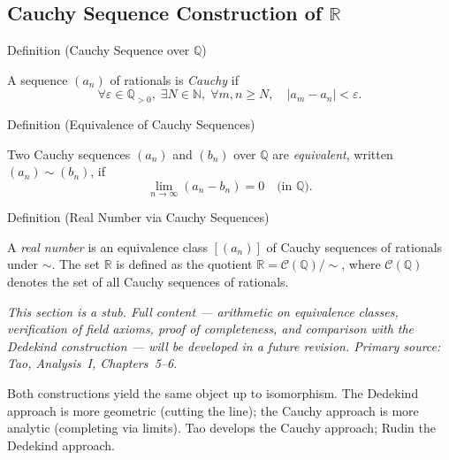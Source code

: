 
\subsection{\texorpdfstring{Cauchy Sequence Construction of $\mathbb{R}$}{Cauchy Sequence Construction of R}}

\begin{definitionbox}{Definition (Cauchy Sequence over $\mathbb{Q}$)}
\begin{definition}\label{def:cauchy-q}
A sequence $(a_n)$ of rationals is \emph{Cauchy} if
\[
  \forall \varepsilon \in \mathbb{Q}_{>0},\;
  \exists N \in \mathbb{N},\;
  \forall m, n \geq N,\quad |a_m - a_n| < \varepsilon.
\]
\end{definition}
\end{definitionbox}

\begin{definitionbox}{Definition (Equivalence of Cauchy Sequences)}
\begin{definition}\label{def:cauchy-equiv}
Two Cauchy sequences $(a_n)$ and $(b_n)$ over $\mathbb{Q}$ are
\emph{equivalent}, written $(a_n) \sim (b_n)$, if
\[
  \lim_{n\to\infty}(a_n - b_n) = 0 \quad \text{(in } \mathbb{Q}\text{)}.
\]
\end{definition}
\end{definitionbox}

\begin{definitionbox}{Definition (Real Number via Cauchy Sequences)}
\begin{definition}\label{def:real-as-cauchy}
A \emph{real number} is an equivalence class $[(a_n)]$ of Cauchy sequences
of rationals under $\sim$.
The set $\mathbb{R}$ is defined as the quotient
$\mathbb{R} = \mathcal{C}(\mathbb{Q}) / {\sim}$,
where $\mathcal{C}(\mathbb{Q})$ denotes the set of all Cauchy sequences
of rationals.
\end{definition}
\end{definitionbox}

\begin{remark*}[Status]
\textit{This section is a stub. Full content --- arithmetic on equivalence classes,
verification of field axioms, proof of completeness, and comparison with the
Dedekind construction --- will be developed in a future revision.
Primary source: Tao, \textit{Analysis~I}, Chapters~5--6.}
\end{remark*}

\begin{remark*}
Both constructions yield the same object up to isomorphism.
The Dedekind approach is more geometric (cutting the line);
the Cauchy approach is more analytic (completing via limits).
Tao develops the Cauchy approach; Rudin the Dedekind approach.
\end{remark*}
